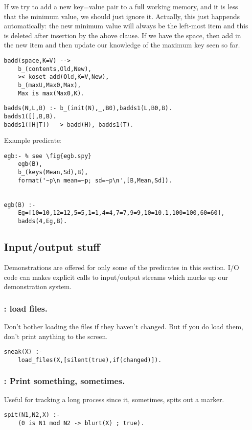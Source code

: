 If we try to add a new key=value pair to a full working memory, and
it is less that the minimum value, we should just ignore it.
Actually, this just happends automatically: the new minimum value will
always be the left-most item and this is deleted after insertion by
the above clause.
%
If we have the space, then add in the new item and
then update our knowledge of the maximum key seen so far.
\begin{Verbatim}
badd(space,K=V) -->
	b_(contents,Old,New),
	>< koset_add(Old,K=V,New),
	b_(maxU,Max0,Max),
	Max is max(Max0,K).
\end{Verbatim}
\begin{Verbatim}
badds(N,L,B) :- b_(init(N),_,B0),badds1(L,B0,B).
badds1([],B,B).
badds1([H|T]) --> badd(H), badds1(T).
\end{Verbatim}
Example predicate:
\begin{Verbatim}
egb:- % see \fig{egb.spy}
	egb(B),
	b_(keys(Mean,Sd),B),
	format('~p\n mean=~p; sd=~p\n',[B,Mean,Sd]). 
	

egb(B) :-
	Eg=[10=10,12=12,5=5,1=1,4=4,7=7,9=9,10=10.1,100=100,60=60],
	badds(4,Eg,B).
\end{Verbatim}

\subsection{ Input/output stuff
}
Demonstrations are offered for only some of the predicates in this
section. I/O code can makes explicit calls to
input/output streams which mucks up our demonstration system.
\subsubsection{ : load files.
}
Don't bother loading the files if they haven't changed.
But if you do load them, don't print anything to the screen.
\begin{Verbatim}
sneak(X) :- 
    load_files(X,[silent(true),if(changed)]).
\end{Verbatim}
\subsubsection{ : Print something, sometimes.
}
Useful for tracking a long process since it, sometimes,
spits out a marker.
\begin{Verbatim}
spit(N1,N2,X) :- 
    (0 is N1 mod N2 -> blurt(X) ; true).
\end{Verbatim}
